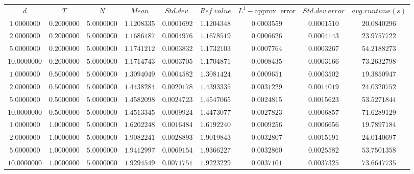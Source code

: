 \begin{tabular}{ccccccccc}
$d$ & $T$ & $N$ & $Mean$ & $Std. dev.$ & $Ref. value$ & $L^1-$approx. error & $Std. dev. error$ & $avg. runtime (s)$\\
$1.0000000$ & $0.2000000$ & $5.0000000$ & $1.1208335$ & $0.0001692$ & $1.1204348$ & $0.0003559$ & $0.0001510$ & $20.0840296$\\
$2.0000000$ & $0.2000000$ & $5.0000000$ & $1.1686187$ & $0.0004976$ & $1.1678519$ & $0.0006626$ & $0.0004143$ & $23.9757722$\\
$5.0000000$ & $0.2000000$ & $5.0000000$ & $1.1741212$ & $0.0003832$ & $1.1732103$ & $0.0007764$ & $0.0003267$ & $54.2188273$\\
$10.0000000$ & $0.2000000$ & $5.0000000$ & $1.1714743$ & $0.0003705$ & $1.1704871$ & $0.0008435$ & $0.0003166$ & $73.2632798$\\
$1.0000000$ & $0.5000000$ & $5.0000000$ & $1.3094049$ & $0.0004582$ & $1.3081424$ & $0.0009651$ & $0.0003502$ & $19.3850947$\\
$2.0000000$ & $0.5000000$ & $5.0000000$ & $1.4438284$ & $0.0020178$ & $1.4393335$ & $0.0031229$ & $0.0014019$ & $24.0320752$\\
$5.0000000$ & $0.5000000$ & $5.0000000$ & $1.4582098$ & $0.0024723$ & $1.4547065$ & $0.0024815$ & $0.0015623$ & $53.5271844$\\
$10.0000000$ & $0.5000000$ & $5.0000000$ & $1.4513345$ & $0.0009924$ & $1.4473077$ & $0.0027823$ & $0.0006857$ & $71.6289129$\\
$1.0000000$ & $1.0000000$ & $5.0000000$ & $1.6202248$ & $0.0016484$ & $1.6192240$ & $0.0009256$ & $0.0006656$ & $19.7897184$\\
$2.0000000$ & $1.0000000$ & $5.0000000$ & $1.9082241$ & $0.0028893$ & $1.9019843$ & $0.0032807$ & $0.0015191$ & $24.0140697$\\
$5.0000000$ & $1.0000000$ & $5.0000000$ & $1.9412997$ & $0.0069154$ & $1.9366227$ & $0.0032860$ & $0.0025582$ & $53.7501358$\\
$10.0000000$ & $1.0000000$ & $5.0000000$ & $1.9294549$ & $0.0071751$ & $1.9223229$ & $0.0037101$ & $0.0037325$ & $73.6647735$\\
\end{tabular}
